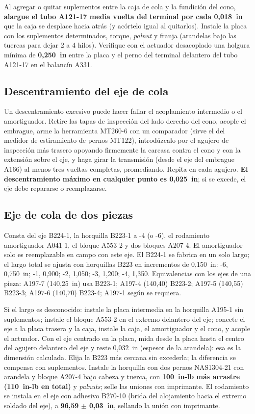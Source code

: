 Al agregar o quitar suplementos entre la caja de cola y la fundición del cono, \textbf{alargue el tubo A121-17 media vuelta del terminal por cada 0,018~in} que la caja se desplace hacia atrás (y acórtelo igual al quitarlos). Instale la placa con los suplementos determinados, torque, \emph{palnut} y franja (arandelas bajo las tuercas para dejar 2 a 4 hilos). Verifique con el actuador desacoplado una holgura mínima de \textbf{0,250~in} entre la placa y el perno del terminal delantero del tubo A121-17 en el balancín A331.

\subsection{Descentramiento del eje de cola}

Un descentramiento excesivo puede hacer fallar el acoplamiento intermedio o el amortiguador. Retire las tapas de inspección del lado derecho del cono, acople el embrague, arme la herramienta MT260-6 con un comparador (sirve el del medidor de estiramiento de pernos MT122), introdúzcalo por el agujero de inspección más trasero apoyando firmemente la carcasa contra el cono y con la extensión sobre el eje, y haga girar la transmisión (desde el eje del embrague A166) al menos tres vueltas completas, promediando. Repita en cada agujero. \textbf{El descentramiento máximo en cualquier punto es 0,025~in}; si se excede, el eje debe repararse o reemplazarse.

\subsection{Eje de cola de dos piezas}

Consta del eje B224-1, la horquilla B223-1 a -4 (o -6), el rodamiento amortiguador A041-1, el bloque A553-2 y dos bloques A207-4. El amortiguador solo es reemplazable en campo con este eje. El B224-1 se fabrica en un solo largo; el largo total se ajusta con horquillas B223 en incrementos de 0,150~in: -6, 0,750~in; -1, 0,900; -2, 1,050; -3, 1,200; -4, 1,350. Equivalencias con los ejes de una pieza: A197-7 (140,25~in) usa B223-1; A197-4 (140,40) B223-2; A197-5 (140,55) B223-3; A197-6 (140,70) B223-4; A197-1 según se requiera.

Si el largo es desconocido: instale la placa intermedia en la horquilla A195-1 sin suplementos; instale el bloque A553-2 en el extremo delantero del eje; conecte el eje a la placa trasera y la caja, instale la caja, el amortiguador y el cono, y acople el actuador. Con el eje centrado en la placa, mida desde la placa hasta el centro del agujero delantero del eje y reste 0,032~in (espesor de la arandela): esa es la dimensión calculada. Elija la B223 más cercana sin excederla; la diferencia se compensa con suplementos. Instale la horquilla con dos pernos NAS1304-21 con arandela y bloque A207-4 bajo cabeza y tuerca, con \textbf{100~in-lb más arrastre (110~in-lb en total)} y \emph{palnuts}; selle las uniones con imprimante. El rodamiento se instala en el eje con adhesivo B270-10 (brida del alojamiento hacia el extremo soldado del eje), a \textbf{96,59 $\pm$ 0,03~in}, sellando la unión con imprimante.

